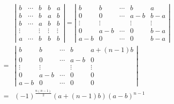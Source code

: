 \documentclass[13pt,fontset=mac]{ctexbeamer}
\begin{document}
\begin{frame}
\begin{align*}
	& \left|\begin{array}{ccccc}
		b & \cdots & b & b & a \\
		b & \cdots & b & a & b \\
		b & \cdots & a & b & b \\
		\vdots & & \vdots & \vdots & \vdots \\
		a & \cdots & b & b & b
	\end{array}\right|   
=	\left|\begin{array}{ccccc}
	b & b & \cdots & b & a \\
	0 & 0 & \cdots & a-b & b-a \\
	\vdots & \vdots & & \vdots & \vdots \\
	0 & a-b & \cdots & 0 & b -a\\
	a-b& 0 & \cdots & 0 & b-a
\end{array}\right|   \\[8pt]
=	& \left|\begin{array}{ccccc}
b & b & \cdots & b & a+(n-1)b \\
0 & 0 & \cdots & a-b & 0 \\
\vdots & \vdots & & \vdots & \vdots \\
0 & a-b & \cdots & 0 & 0 \\
a-b& 0 & \cdots & 0 & 0
\end{array}\right|   \\[8pt]
= & (-1)^{\frac{n(n-1)}{2}}(a+(n-1) b)(a-b)^{n-1}
\end{align*}
\end{frame}
\end{document}
